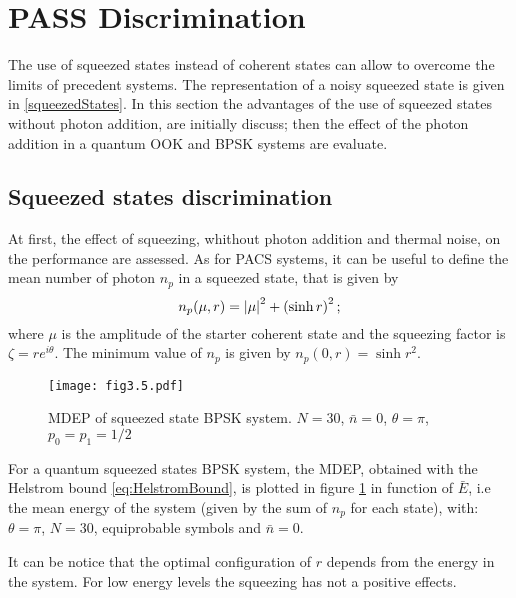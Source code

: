 \section{PASS Discrimination}
    The use of squeezed states instead of coherent states can allow to overcome the limits
    of precedent systems. The representation of a noisy squeezed state is given in 
    \ref{squeezedStates}. In this section the advantages of the use of squeezed states 
    without photon addition, are initially discuss; then the effect of the photon addition
    in a quantum OOK and BPSK systems are evaluate.

    \subsection{Squeezed states discrimination}
        At first, the effect of squeezing, whithout photon addition and thermal noise, on the
        performance are assessed. As for PACS systems, it can be useful to define the mean 
        number of photon $n_p$ in a squeezed state, that is given by
        \begin{equation}
            n_p(\mu,r) = \absolutevalue{\mu}^2 + \left(\sinh{r}\right)^2;
        \end{equation}
        where $\mu$ is the amplitude of the starter coherent state and the squeezing factor
        is $\zeta = r e^{i\theta}$. The minimum value of $n_p$ is given by $n_p(0,r) = \sinh{r}^2$.

        \begin{figure}[ht]
            \begin{center}
                \texttt{[image: fig3.5.pdf]}
                \caption{MDEP of squeezed state BPSK system. 
                    $N=30$, $\bar{n}=0$, $\theta=\pi$, $p_0=p_1=1/2$}
                \label{fig:3.5}
            \end{center}     
        \end{figure}
        For a quantum squeezed states BPSK system, the MDEP, obtained with the Helstrom bound 
        \ref{eq:HelstromBound}, is plotted in figure \ref{fig:3.5} in function of $\bar{E}$,
        i.e the mean energy of the system (given by the sum of $n_p$ for each state), with:
        $\theta=\pi$, $N=30$, equiprobable symbols and $\bar{n}=0$.

        It can be notice that the optimal configuration of $r$ depends from the energy in the 
        system. For low energy levels the squeezing has not a positive effects.

